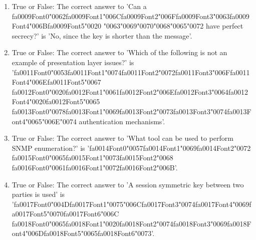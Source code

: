 \documentclass[12pt]{article}
\begin{document}
\begin{enumerate}[label=\arabic*.]
\item True or False: The correct answer to 'Can a {\csname fa0009Font0\endcsname\char"0062}{\csname fa0009Font1\endcsname\char"006C}{\csname fa0009Font2\endcsname\char"006F}{\csname fa0009Font3\endcsname\char"0063}{\csname fa0009Font4\endcsname\char"006B}{\csname fa0009Font5\endcsname\char"0020} {\char"0063}{\char"0069}{\char"0070}{\char"0068}{\char"0065}{\char"0072} have perfect secrecy?' is 'No, since the key is shorter than the message'.
\item True or False: The correct answer to 'Which of the following is not an example of presentation layer issues?' is '{\csname fa0011Font0\endcsname\char"0053}{\csname fa0011Font1\endcsname\char"0074}{\csname fa0011Font2\endcsname\char"0072}{\csname fa0011Font3\endcsname\char"006F}{\csname fa0011Font4\endcsname\char"006E}{\csname fa0011Font5\endcsname\char"0067} {\csname fa0012Font0\endcsname\char"0020}{\csname fa0012Font1\endcsname\char"0061}{\csname fa0012Font2\endcsname\char"006E}{\csname fa0012Font3\endcsname\char"0064}{\csname fa0012Font4\endcsname\char"0020}{\csname fa0012Font5\endcsname\char"0065} {\csname fa0013Font0\endcsname\char"0078}{\csname fa0013Font1\endcsname\char"0069}{\csname fa0013Font2\endcsname\char"0073}{\csname fa0013Font3\endcsname\char"0074}{\csname fa0013Font4\endcsname\char"0065}{\char"006E}{\char"0074} authentication mechanisms'.
\item True or False: The correct answer to 'What tool can be used to perform SNMP enumeration?' is '{\csname fa0014Font0\endcsname\char"0057}{\csname fa0014Font1\endcsname\char"0069}{\csname fa0014Font2\endcsname\char"0072} {\csname fa0015Font0\endcsname\char"0065}{\csname fa0015Font1\endcsname\char"0073}{\csname fa0015Font2\endcsname\char"0068} {\csname fa0016Font0\endcsname\char"0061}{\csname fa0016Font1\endcsname\char"0072}{\csname fa0016Font2\endcsname\char"006B}'.
\item True or False: The correct answer to 'A session symmetric key between two parties is used' is '{\csname fa0017Font0\endcsname\char"004D}{\csname fa0017Font1\endcsname\char"0075}{\char"006C}{\csname fa0017Font3\endcsname\char"0074}{\csname fa0017Font4\endcsname\char"0069}{\csname fa0017Font5\endcsname\char"0070}{\csname fa0017Font6\endcsname\char"006C} {\csname fa0018Font0\endcsname\char"0065}{\csname fa0018Font1\endcsname\char"0020}{\csname fa0018Font2\endcsname\char"0074}{\csname fa0018Font3\endcsname\char"0069}{\csname fa0018Font4\endcsname\char"006D}{\csname fa0018Font5\endcsname\char"0065}{\csname fa0018Font6\endcsname\char"0073}'.

\end{enumerate}
\end{document}
